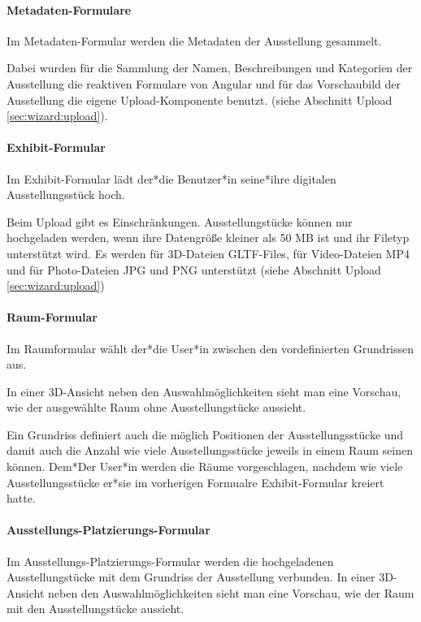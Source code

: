 \paragraph{Metadaten-Formulare}
Im Metadaten-Formular werden die Metadaten der Ausstellung gesammelt.


Dabei wurden für die Sammlung der Namen, Beschreibungen und Kategorien der Ausstellung die reaktiven Formulare von Angular und für das Vorschaubild der Ausstellung die eigene Upload-Komponente benutzt. (siehe Abschnitt Upload \ref{sec:wizard:upload}).


\paragraph{Exhibit-Formular}
Im Exhibit-Formular lädt der*die Benutzer*in seine*ihre digitalen Ausstellungsstück hoch.

Beim Upload gibt es Einschränkungen. Ausstellungstücke können nur hochgeladen werden, wenn ihre Datengröße kleiner als 50 MB ist und ihr Filetyp unterstützt wird. Es werden für 3D-Dateien GLTF-Files, für Video-Dateien MP4 und für Photo-Dateien JPG und PNG unterstützt (siehe Abschnitt Upload \ref{sec:wizard:upload})

\paragraph{Raum-Formular}
Im Raumformular wählt der*die User*in zwischen den vordefinierten Grundrissen aus.

In einer 3D-Ansicht neben den Auswahlmöglichkeiten sieht man eine Vorschau, wie der ausgewählte Raum ohne Ausstellungstücke aussieht. 

Ein Grundriss definiert auch die möglich Positionen der Ausstellungsstücke und damit auch die Anzahl wie viele Ausstellungsstücke jeweils in einem Raum seinen können. Dem*Der User*in werden die Räume vorgeschlagen, nachdem wie viele Ausstellungsstücke er*sie im vorherigen Formualre Exhibit-Formular kreiert hatte. 

\paragraph{Ausstellungs-Platzierungs-Formular}
Im Ausstellungs-Platzierungs-Formular werden die hochgeladenen Ausstellungstücke mit dem Grundriss der Ausstellung verbunden.  In einer 3D-Ansicht neben den Auswahlmöglichkeiten sieht man eine Vorschau, wie der Raum mit den Ausstellungstücke aussieht. 

